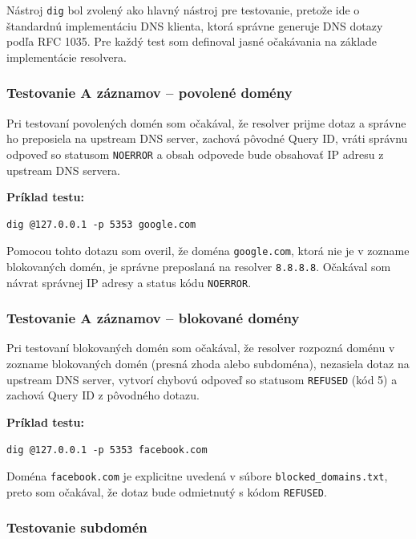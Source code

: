\documentclass[12pt,a4paper]{article}
\begin{document}
Nástroj \texttt{dig} bol zvolený ako hlavný nástroj pre testovanie, pretože ide o štandardnú implementáciu DNS klienta, ktorá správne generuje DNS dotazy podľa RFC 1035. Pre každý test som definoval jasné očakávania na základe implementácie resolvera.

\subsubsection{Testovanie A záznamov -- povolené domény}

Pri testovaní povolených domén som očakával, že resolver prijme dotaz a správne ho preposiela na upstream DNS server, zachová pôvodné Query ID, vráti správnu odpoveď so statusom \texttt{NOERROR} a obsah odpovede bude obsahovať IP adresu z upstream DNS servera.

\textbf{Príklad testu:}

\begin{verbatim}
dig @127.0.0.1 -p 5353 google.com
\end{verbatim}

Pomocou tohto dotazu som overil, že doména \texttt{google.com}, ktorá nie je v zozname blokovaných domén, je správne preposlaná na resolver \texttt{8.8.8.8}. Očakával som návrat správnej IP adresy a status kódu \texttt{NOERROR}.

\subsubsection{Testovanie A záznamov -- blokované domény}

Pri testovaní blokovaných domén som očakával, že resolver rozpozná doménu v zozname blokovaných domén (presná zhoda alebo subdoména), nezasiela dotaz na upstream DNS server, vytvorí chybovú odpoveď so statusom \texttt{REFUSED} (kód 5) a zachová Query ID z pôvodného dotazu.

\textbf{Príklad testu:}

\begin{verbatim}
dig @127.0.0.1 -p 5353 facebook.com
\end{verbatim}

Doména \texttt{facebook.com} je explicitne uvedená v súbore \texttt{blocked\_domains.txt}, preto som očakával, že dotaz bude odmietnutý s kódom \texttt{REFUSED}.

\subsubsection{Testovanie subdomén}
\end{document}

